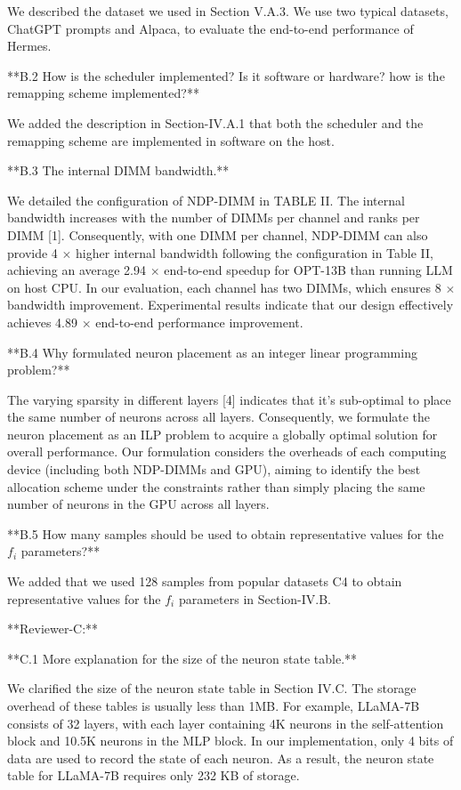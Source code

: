 We described the dataset we used in Section V.A.3. We use two typical datasets, ChatGPT prompts and Alpaca, to evaluate the end-to-end performance of Hermes. 

**B.2 How is the scheduler implemented? Is it software or hardware? how is the remapping scheme implemented?**

We added the description in Section-IV.A.1 that both the scheduler and the remapping scheme are implemented in software on the host.

**B.3 The internal DIMM bandwidth.**

We detailed the configuration of NDP-DIMM in TABLE II. The internal bandwidth increases with the number of DIMMs per channel and ranks per DIMM [1]. Consequently, with one DIMM per channel, NDP-DIMM can also provide 4 $\times$ higher internal bandwidth following the configuration in Table II, achieving an average 2.94 $\times$ end-to-end speedup for OPT-13B than running LLM on host CPU. In our evaluation, each channel has two DIMMs, which ensures 8 $\times$ bandwidth improvement. Experimental results indicate that our design effectively achieves 4.89 $\times$ end-to-end performance improvement.

**B.4 Why formulated neuron placement as an integer linear programming problem?**

The varying sparsity in different layers [4] indicates that it's sub-optimal to place the same number of neurons across all layers. Consequently, we formulate the neuron placement as an ILP problem to acquire a globally optimal solution for overall performance. Our formulation considers the overheads of each computing device (including both NDP-DIMMs and GPU), aiming to identify the best allocation scheme under the constraints rather than simply placing the same number of neurons in the GPU across all layers.

**B.5 How many samples should be used to obtain representative values for the $f_i$ parameters?**

We added that we used 128 samples from popular datasets C4 to obtain representative values for the $f_i$ parameters in Section-IV.B.

**Reviewer-C:**

**C.1 More explanation for the size of the neuron state table.**

We clarified the size of the neuron state table in Section IV.C. The storage overhead of these tables is usually less than 1MB. For example, LLaMA-7B consists of 32 layers, with each layer containing 4K neurons in the self-attention block and 10.5K neurons in the MLP block. In our implementation, only 4 bits of data are used to record the state of each neuron. As a result, the neuron state table for LLaMA-7B requires only 232 KB of storage.

